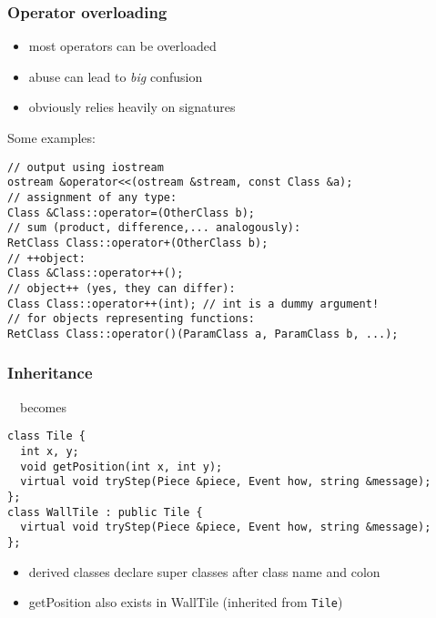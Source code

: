 \documentclass{slides}
\begin{document}
\begin{frame}[fragile]
  \frametitle{Operator overloading}

  \begin{itemize}
  \item most operators can be overloaded
  \item abuse can lead to \emph{big} confusion
  \item obviously relies heavily on signatures
  \end{itemize}

Some examples:
\begin{lstlisting}
// output using iostream
ostream &operator<<(ostream &stream, const Class &a);
// assignment of any type:
Class &Class::operator=(OtherClass b);
// sum (product, difference,... analogously):
RetClass Class::operator+(OtherClass b);
// ++object:
Class &Class::operator++();
// object++ (yes, they can differ):
Class Class::operator++(int); // int is a dummy argument!
// for objects representing functions:
RetClass Class::operator()(ParamClass a, ParamClass b, ...);
\end{lstlisting}

\end{frame}

\begin{frame}[fragile]
  \frametitle{Inheritance}
  ~~becomes
  \medskip
\begin{lstlisting}[emph={public}]
class Tile {
  int x, y;
  void getPosition(int x, int y);
  virtual void tryStep(Piece &piece, Event how, string &message);
};
class WallTile : public Tile {
  virtual void tryStep(Piece &piece, Event how, string &message);
};
\end{lstlisting}

  \begin{itemize}
  \item derived classes declare super classes after class name and colon
  \item getPosition also exists in WallTile (\alert{inherited} from \lstinline!Tile!)
  \end{itemize}
\end{frame}
\end{document}
